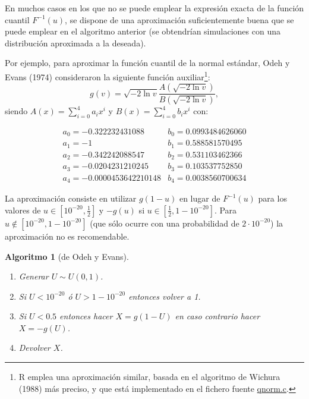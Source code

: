 \documentclass[
]{book}
\theoremstyle{break}
\newtheorem{conjecture}{Algoritmo}[chapter]
\theoremstyle{nonumberplain}
\begin{document}
En muchos casos en los que no se puede emplear la expresión exacta de la función
cuantil \(F^{-1}\left( u\right)\), se dispone de una aproximación suficientemente
buena que se puede emplear en el algoritmo anterior (se obtendrían simulaciones
con una distribución aproximada a la deseada).

Por ejemplo, para aproximar la función cuantil de la normal estándar,
Odeh y Evans (1974) consideraron la siguiente función auxiliar\footnote{R emplea una aproximación similar, basada en el algoritmo de Wichura (1988) más preciso, y que está implementado en el fichero fuente \href{https://svn.r-project.org/R/trunk/src/nmath/qnorm.c}{qnorm.c}.}:
\[ g\left( v\right)  =\sqrt{-2\ln v}\frac{A\left( \sqrt{-2\ln v}\right)
}{B\left( \sqrt{-2\ln v}\right)  },\]
siendo \(A(x) =\sum_{i=0}^{4}a_{i}x^{i}\)
y \(B(x) =\sum_{i=0}^{4}b_{i}x^{i}\) con:

\[\begin{array}{ll}
a_{0}=-0.322232431088 &  b_{0}=0.0993484626060 \\
a_{1}=-1 &  b_{1}=0.588581570495 \\
a_{2}=-0.342242088547 & b_{2}=0.531103462366 \\
a_{3}=-0.0204231210245 & b_{3}=0.103537752850 \\
a_{4}=-0.0000453642210148 & b_{4}=0.0038560700634
\end{array}\]

La aproximación consiste en utilizar \(g\left( 1-u\right)\) en lugar de
\(F^{-1}\left( u\right)\) para los valores de \(u\in[10^{-20},\frac12]\)
y \(-g\left( u\right)\) si \(u\in[\frac12,1-10^{-20}]\). Para \(u\notin [10^{-20},1-10^{-20}]\) (que sólo ocurre con una probabilidad de
\(2\cdot10^{-20}\)) la aproximación no es recomendable.

\begin{conjecture}[de Odeh y Evans]
\protect\hypertarget{cnj:Odeh-Evans}{}\label{cnj:Odeh-Evans}

\begin{enumerate}
\def\labelenumi{\arabic{enumi}.}
\item
  Generar \(U \sim U(0, 1)\).
\item
  Si \(U<10^{-20}\) ó \(U>1-10^{-20}\) entonces volver a 1.
\item
  Si \(U<0.5\) entonces hacer \(X=g\left(1-U\right)\)
  en caso contrario hacer \(X=-g\left( U\right)\).
\item
  Devolver \(X\).
\end{enumerate}

\end{conjecture}
\end{document}
